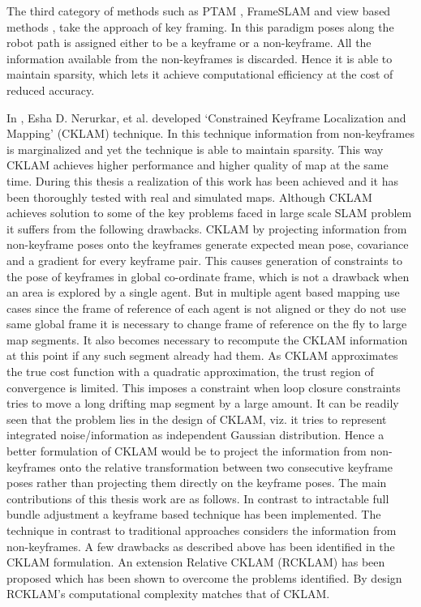 The third category of methods such as PTAM \cite{}, FrameSLAM \cite{} and view based methods \cite {}, take the approach of key framing. In this paradigm poses along the robot path is assigned either to be a keyframe or a non-keyframe. All the information available from the non-keyframes is discarded. Hence it is able to maintain sparsity, which lets it achieve computational efficiency at the cost of reduced accuracy. 

In \cite{}, Esha D. Nerurkar, et al. developed `Constrained Keyframe Localization and Mapping' (CKLAM) technique. In this technique information from non-keyframes is marginalized and yet the technique is able to maintain sparsity. This way CKLAM achieves higher performance and higher quality of map at the same time. During this thesis a realization of this work has been achieved and it has been thoroughly tested with real and simulated maps. Although CKLAM achieves solution to some of the key problems faced in large scale SLAM problem it suffers from the following drawbacks. CKLAM by projecting information from non-keyframe poses onto the keyframes generate expected mean pose, covariance and a gradient for every keyframe pair. This causes generation of constraints to the pose of keyframes in global co-ordinate frame, which is not a drawback when an area is explored by a single agent. But in multiple agent based mapping use cases since the frame of reference of each agent is not aligned or they do not use same global frame it is necessary to change frame of reference on the fly to large map segments. It also becomes necessary to recompute the CKLAM information at this point if any such segment already had them. As CKLAM approximates the true cost function with a quadratic approximation, the trust region of convergence is limited. This imposes a constraint when loop closure constraints tries to move a long drifting map segment by a large amount. It can be readily seen that the problem lies in the design of CKLAM, viz. it tries to represent integrated noise/information as independent Gaussian distribution. Hence a better formulation of CKLAM would be to project the information from non-keyframes onto the relative transformation between two consecutive keyframe poses rather than projecting them directly on the keyframe poses. The main contributions of this thesis work are as follows. In contrast to intractable full bundle adjustment a keyframe based technique has been implemented. The technique in contrast to traditional approaches considers the information from non-keyframes. A few drawbacks as described above has been identified in the CKLAM formulation. An extension Relative CKLAM (RCKLAM) has been proposed which has been shown to overcome the problems identified. By design RCKLAM's computational complexity matches that of CKLAM. 

